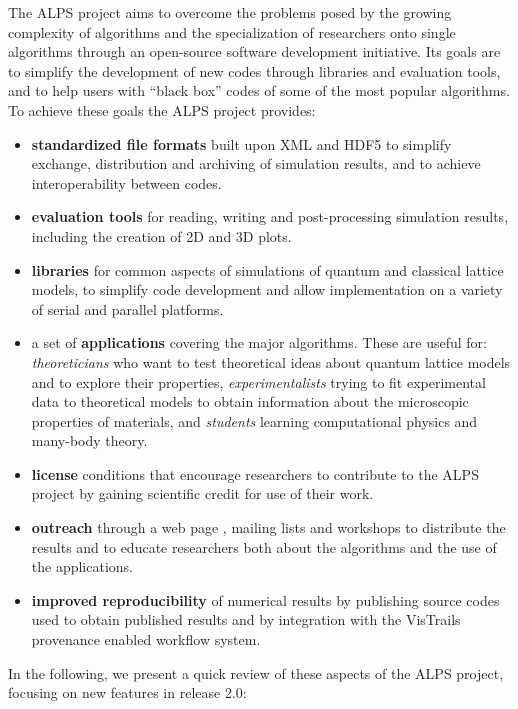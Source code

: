 \documentclass[12pt]{iopart}
\begin{document}
The ALPS project aims to
overcome the problems posed by the growing complexity of algorithms
and the specialization of researchers onto single algorithms through
an open-source software development initiative. Its goals are to simplify the development of new codes through libraries and evaluation tools, and to help users with ``black box'' codes of some of the most popular algorithms. To achieve these goals the ALPS project provides:
\begin{itemize}
\item {\bf standardized file formats} built upon XML \cite{xml} and HDF5 \cite{hdf5} to simplify exchange,
distribution and archiving of simulation results, and to achieve
interoperability between codes.

\item {\bf evaluation tools} for reading, writing and post-processing simulation results, including the creation of 2D and 3D plots.

\item {\bf libraries} for common aspects of
simulations of quantum and classical lattice models, to simplify code
development and allow implementation on a variety of serial and parallel platforms.
\item a set of {\bf applications} covering the major algorithms. These are useful for: 
{\it theoreticians} who want to test theoretical ideas about quantum
lattice models and to explore their properties,  
{\it experimentalists} trying to fit experimental data to theoretical
models to obtain information about the microscopic properties of
materials, and {\it students} learning computational physics and many-body theory.
\item{\bf license} conditions \cite{librarylicense,applicationlicense} that encourage researchers to contribute
to the ALPS project by gaining scientific credit for use of their
work.
\item {\bf outreach} through a web page \cite{alps}, mailing lists and
workshops to distribute the results and to educate researchers both
about the algorithms and the use of the applications.
\item {\bf improved reproducibility} of numerical results by
publishing source codes used to obtain published results and by integration with the VisTrails \cite{vistrails} provenance enabled workflow system.
\end{itemize}



 In the following, we present a quick review of these
 aspects of the ALPS project, focusing on new features in release 2.0:
 
\end{document}
